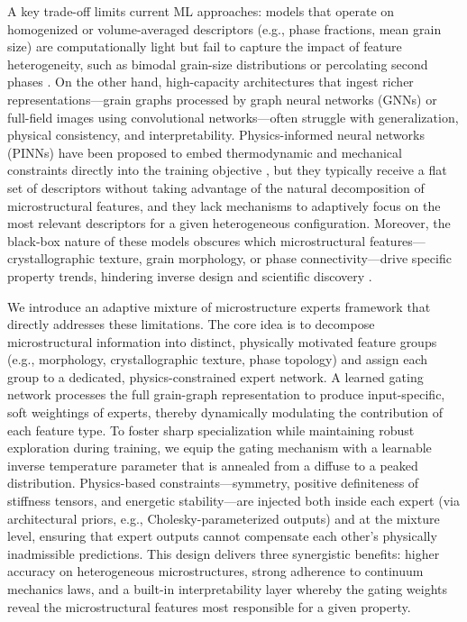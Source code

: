 \documentclass{article}
\begin{document}
A key trade-off limits current ML approaches: models that operate on homogenized or volume-averaged descriptors (e.g., phase fractions, mean grain size) are computationally light but fail to capture the impact of feature heterogeneity, such as bimodal grain-size distributions or percolating second phases \cite{shen2018microstructure}. On the other hand, high-capacity architectures that ingest richer representations—grain graphs processed by graph neural networks (GNNs) \cite{chen2019graph, geiger2020gnn} or full-field images using convolutional networks—often struggle with generalization, physical consistency, and interpretability. Physics-informed neural networks (PINNs) have been proposed to embed thermodynamic and mechanical constraints directly into the training objective \cite{raissi2019pinn, wong2020physics}, but they typically receive a flat set of descriptors without taking advantage of the natural decomposition of microstructural features, and they lack mechanisms to adaptively focus on the most relevant descriptors for a given heterogeneous configuration. Moreover, the black-box nature of these models obscures which microstructural features—crystallographic texture, grain morphology, or phase connectivity—drive specific property trends, hindering inverse design and scientific discovery \cite{liu2021interpretable}.

We introduce an adaptive mixture of microstructure experts framework that directly addresses these limitations. The core idea is to decompose microstructural information into distinct, physically motivated feature groups (e.g., morphology, crystallographic texture, phase topology) and assign each group to a dedicated, physics-constrained expert network. A learned gating network processes the full grain-graph representation to produce input-specific, soft weightings of experts, thereby dynamically modulating the contribution of each feature type. To foster sharp specialization while maintaining robust exploration during training, we equip the gating mechanism with a learnable inverse temperature parameter that is annealed from a diffuse to a peaked distribution. Physics-based constraints—symmetry, positive definiteness of stiffness tensors, and energetic stability—are injected both inside each expert (via architectural priors, e.g., Cholesky-parameterized outputs) and at the mixture level, ensuring that expert outputs cannot compensate each other’s physically inadmissible predictions. This design delivers three synergistic benefits: higher accuracy on heterogeneous microstructures, strong adherence to continuum mechanics laws, and a built-in interpretability layer whereby the gating weights reveal the microstructural features most responsible for a given property.
\end{document}
